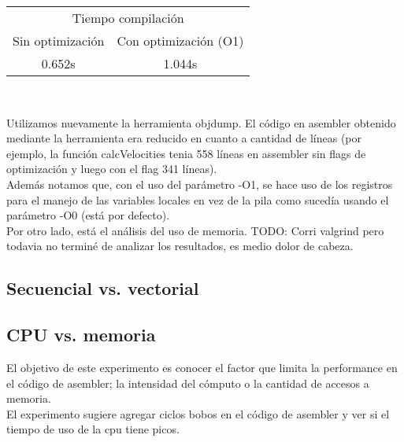 \begin{center}
	\begin{tabular}{cc}  
		\toprule 
		\multicolumn{2}{c}{Tiempo compilación} \\
		\cmidrule(r){1-2}
		Sin optimización & Con optimización (O1) \\
		\midrule
		0.652s	&	1.044s	\\
		\bottomrule
	\end{tabular}\\
\end{center}

Utilizamos nuevamente la herramienta objdump. El código en asembler obtenido mediante la herramienta era reducido en cuanto a cantidad de líneas (por ejemplo, la función calcVelocities tenia 558 líneas en assembler sin flags de optimización y luego con el flag 341 líneas).\\

Además notamos que, con el uso del parámetro -O1, se hace uso de los registros para el manejo de las variables locales en vez de la pila como sucedía usando el parámetro -O0 (está por defecto).\\

Por otro lado, está el análisis del uso de memoria.
TODO: Corri valgrind pero todavia no terminé de analizar los resultados, es medio dolor de cabeza.


\subsection{Secuencial vs. vectorial}



\subsection{CPU vs. memoria}

El objetivo de este experimento es conocer el factor que limita la performance en el código de asembler; la intensidad del cómputo o la cantidad de accesos a memoria.\\
El experimento sugiere agregar ciclos bobos en el código de asembler y ver si el tiempo de uso de la cpu tiene picos.







